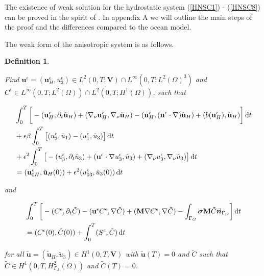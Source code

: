 \documentclass[11pt]{article}
\newtheorem{definition}{Definition}
\newcommand*\diff{\mathop{}\!\mathrm{d}}
\begin{document}
  The existence of weak solution for the hydrostatic system (\ref{HNSC1}) - (\ref{HNSC8}) can be proved in the spirit of \cite{temam2005some}. In appendix A we will outline the main steps of the proof and the differences compared to the ocean model.

  The weak form of the anisotropic system is as follows.
  
  \begin{definition} \label{definitionanisotropicWF}
  
  Find $\mathbf{u}^\epsilon = (\mathbf{u}^\epsilon_H, u^\epsilon_3) \in L^2 (0,T ; \mathbf{V}) \cap L^\infty (0, T; L^2 (\Omega)^3)$ and $C^\epsilon \in L^\infty (0,T; L^2(\Omega)) \cap L^2 (0,T; H^1(\Omega))$, such that
  
  \begin{equation}
    \begin{split}
      & \int_0^T \bigg [ -(\mathbf{u}^\epsilon_H, \partial_t \mathbf{\tilde{u}}_H) + (\nabla_\nu \mathbf{u}^\epsilon_H, \nabla_\nu \mathbf{\tilde{u}}_H) - (\mathbf{u}^\epsilon_H, (\mathbf{u}^\epsilon \cdot \nabla) \mathbf{\tilde{u}}_H) + (b(\mathbf{u}^\epsilon_H), \mathbf{\tilde{u}}_H) \bigg ] \diff t \\
      & + \epsilon \beta \int_0 ^ T \big [ (u_3 ^\epsilon, \tilde{u}_1) - (u_1^\epsilon, \tilde{u}_3) \big ] \diff t\\
      & + \epsilon^2 \int _0 ^ T \big [ -(u_3^\epsilon, \partial_t \tilde{u}_3) +(\mathbf{u}^\epsilon \cdot \nabla u_3 ^ \epsilon, \tilde{u}_3) + (\nabla_\nu u_3^\epsilon, \nabla_\nu \tilde{u}_3) \big ] \diff t \\
      & = (\mathbf{u}^\epsilon_{0H}, \mathbf{\tilde{u}}_H(0)) + \epsilon^2 (u_{03}^\epsilon, \tilde{u}_3 (0)) \diff t \raisetag{20pt} \label{anisotropicWF_U}
    \end{split}
  \end{equation}
  
  and
  
    \begin{equation}
    \begin{split}
      & \int_0^T \bigg [ -(C^\epsilon, \partial_t \tilde{C}) -(\mathbf{u}^\epsilon C^\epsilon, \nabla \tilde{C}) + (\mathbf{M} \nabla C^\epsilon, \nabla \tilde{C}) - \int_{\Gamma_G} \boldsymbol{\sigma} \mathbf{M} \tilde{C} \vec{\boldsymbol{n}}_{\Gamma_G} \bigg ] \diff t \\
      & =  (C^\epsilon (0), \tilde{C} (0)) + \int_0^T (S^\epsilon,\tilde{C}) \diff t \raisetag{20pt} \label{anisotropicWF_C}
    \end{split}
  \end{equation}
  
  for all $\mathbf{\tilde{u}} = (\mathbf{\tilde{u}}_H, \tilde{u}_3) \in H^1 (0,T;\mathbf{V})$ with $\mathbf{\tilde{u}}(T) = 0$ and $\tilde{C}$ such that $\tilde{C} \in H^1 (0,T, H^2_{\Gamma_A} (\Omega))$ and $\tilde{C} (T) = 0$.
  
  \end{definition}
  
\end{document}
